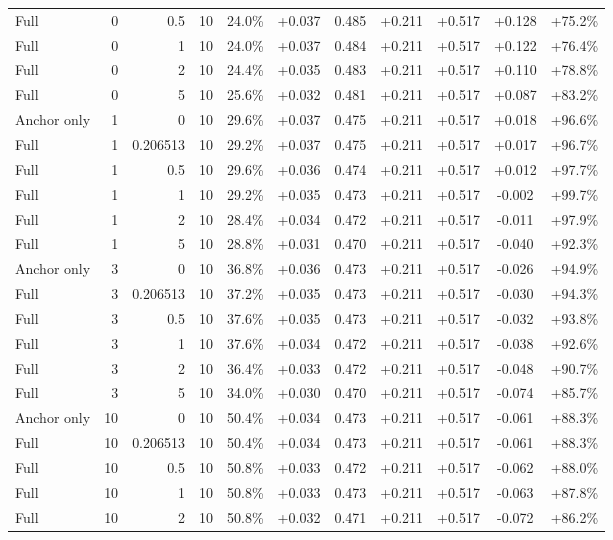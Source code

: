 \begin{table}[htbp]
\begin{tabular}{lrrrccccccc}
Full & 0 & 0.5 & 10 & 24.0\% & +0.037 & 0.485 & +0.211 & +0.517 & +0.128 & +75.2\% \\
Full & 0 & 1 & 10 & 24.0\% & +0.037 & 0.484 & +0.211 & +0.517 & +0.122 & +76.4\% \\
Full & 0 & 2 & 10 & 24.4\% & +0.035 & 0.483 & +0.211 & +0.517 & +0.110 & +78.8\% \\
Full & 0 & 5 & 10 & 25.6\% & +0.032 & 0.481 & +0.211 & +0.517 & +0.087 & +83.2\% \\
Anchor only & 1 & 0 & 10 & 29.6\% & +0.037 & 0.475 & +0.211 & +0.517 & +0.018 & +96.6\% \\
Full & 1 & 0.206513 & 10 & 29.2\% & +0.037 & 0.475 & +0.211 & +0.517 & +0.017 & +96.7\% \\
Full & 1 & 0.5 & 10 & 29.6\% & +0.036 & 0.474 & +0.211 & +0.517 & +0.012 & +97.7\% \\
Full & 1 & 1 & 10 & 29.2\% & +0.035 & 0.473 & +0.211 & +0.517 & -0.002 & +99.7\% \\
Full & 1 & 2 & 10 & 28.4\% & +0.034 & 0.472 & +0.211 & +0.517 & -0.011 & +97.9\% \\
Full & 1 & 5 & 10 & 28.8\% & +0.031 & 0.470 & +0.211 & +0.517 & -0.040 & +92.3\% \\
Anchor only & 3 & 0 & 10 & 36.8\% & +0.036 & 0.473 & +0.211 & +0.517 & -0.026 & +94.9\% \\
Full & 3 & 0.206513 & 10 & 37.2\% & +0.035 & 0.473 & +0.211 & +0.517 & -0.030 & +94.3\% \\
Full & 3 & 0.5 & 10 & 37.6\% & +0.035 & 0.473 & +0.211 & +0.517 & -0.032 & +93.8\% \\
Full & 3 & 1 & 10 & 37.6\% & +0.034 & 0.472 & +0.211 & +0.517 & -0.038 & +92.6\% \\
Full & 3 & 2 & 10 & 36.4\% & +0.033 & 0.472 & +0.211 & +0.517 & -0.048 & +90.7\% \\
Full & 3 & 5 & 10 & 34.0\% & +0.030 & 0.470 & +0.211 & +0.517 & -0.074 & +85.7\% \\
Anchor only & 10 & 0 & 10 & 50.4\% & +0.034 & 0.473 & +0.211 & +0.517 & -0.061 & +88.3\% \\
Full & 10 & 0.206513 & 10 & 50.4\% & +0.034 & 0.473 & +0.211 & +0.517 & -0.061 & +88.3\% \\
Full & 10 & 0.5 & 10 & 50.8\% & +0.033 & 0.472 & +0.211 & +0.517 & -0.062 & +88.0\% \\
Full & 10 & 1 & 10 & 50.8\% & +0.033 & 0.473 & +0.211 & +0.517 & -0.063 & +87.8\% \\
Full & 10 & 2 & 10 & 50.8\% & +0.032 & 0.471 & +0.211 & +0.517 & -0.072 & +86.2\% \\

\end{tabular}
\end{table}
